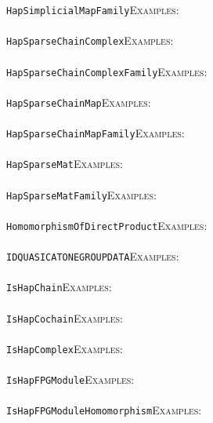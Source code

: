 \documentclass[a4paper,11pt]{report}
\begin{document}
{{ \texttt{HapSimplicialMapFamily}{\nobreakspace}{\nobreakspace}{\nobreakspace}{\nobreakspace}\textsc{Examples:} \\
 \\
 \texttt{HapSparseChainComplex}{\nobreakspace}{\nobreakspace}{\nobreakspace}{\nobreakspace}\textsc{Examples:} \\
 \\
 \texttt{HapSparseChainComplexFamily}{\nobreakspace}{\nobreakspace}{\nobreakspace}{\nobreakspace}\textsc{Examples:} \\
 \\
 \texttt{HapSparseChainMap}{\nobreakspace}{\nobreakspace}{\nobreakspace}{\nobreakspace}\textsc{Examples:} \\
 \\
 \texttt{HapSparseChainMapFamily}{\nobreakspace}{\nobreakspace}{\nobreakspace}{\nobreakspace}\textsc{Examples:} \\
 \\
 \texttt{HapSparseMat}{\nobreakspace}{\nobreakspace}{\nobreakspace}{\nobreakspace}\textsc{Examples:} \\
 \\
 \texttt{HapSparseMatFamily}{\nobreakspace}{\nobreakspace}{\nobreakspace}{\nobreakspace}\textsc{Examples:} \\
 \\
 \texttt{HomomorphismOfDirectProduct}{\nobreakspace}{\nobreakspace}{\nobreakspace}{\nobreakspace}\textsc{Examples:} \\
 \\
 \texttt{IDQUASICATONEGROUP{\textunderscore}DATA}{\nobreakspace}{\nobreakspace}{\nobreakspace}{\nobreakspace}\textsc{Examples:} \\
 \\
 \texttt{IsHapChain}{\nobreakspace}{\nobreakspace}{\nobreakspace}{\nobreakspace}\textsc{Examples:} \\
 \\
 \texttt{IsHapCochain}{\nobreakspace}{\nobreakspace}{\nobreakspace}{\nobreakspace}\textsc{Examples:} \\
 \\
 \texttt{IsHapComplex}{\nobreakspace}{\nobreakspace}{\nobreakspace}{\nobreakspace}\textsc{Examples:} \\
 \\
 \texttt{IsHapFPGModule}{\nobreakspace}{\nobreakspace}{\nobreakspace}{\nobreakspace}\textsc{Examples:} \\
 \\
 \texttt{IsHapFPGModuleHomomorphism}{\nobreakspace}{\nobreakspace}{\nobreakspace}{\nobreakspace}\textsc{Examples:} \\
}}
\end{document}
